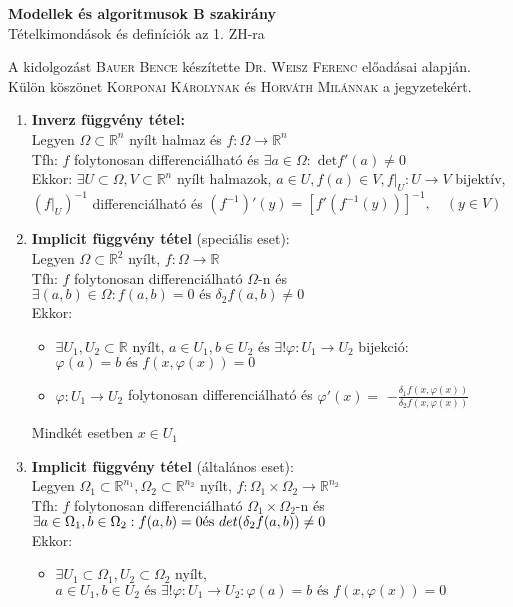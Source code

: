 \documentclass{article}
\begin{document}
\renewcommand{\labelitemi}{\textbullet}
\def\R{\mathbb{R}}
\def\br{\\[0.1cm]}
\def\folytdifh{folytonosan differenciálható }
\begin{center}
	{\Large\textbf{Modellek és algoritmusok B szakirány}}\\[0.2cm]
	Tételkimondások és definíciók az 1. ZH-ra
\end{center}
{\small A kidolgozást \textsc{Bauer Bence} készítette \textsc{Dr. Weisz Ferenc} előadásai alapján.}\\
{\footnotesize Külön köszönet \textsc{Korponai Károlynak} és \textsc{Horváth Milánnak} a jegyzetekért.}

\begin{enumerate}
	\item\textbf{Inverz függvény tétel:}\br
	Legyen $\Omega\subset\R^n$ nyílt halmaz és $f:\Omega\rightarrow\R^n$\br
	Tfh: $f$ \folytdifh és $\exists a\in\Omega:\text{ det}f'(a)\neq0$\br
	Ekkor: $\exists U\subset\Omega, V\subset\R^n$ nyílt halmazok, $a\in U, f(a)\in V,
	f|_U:U\rightarrow V$ bijektív,\br
	$(f|_U)^{-1}$ differenciálható és $(f^{-1})'(y)=[f'(f^{-1}(y))]^{-1},\quad (y\in V)$
	\item\textbf{Implicit függvény tétel} (speciális eset):\br
	Legyen $\Omega\subset\R^2$ nyílt, $f:\Omega\rightarrow\R$\br
	Tfh: $f$ folytonosan differenciálható $\Omega$-n és $\exists(a,b)\in\Omega:
	f(a,b)=0\text{ és }\delta_2f(a,b)\neq0$\br
	Ekkor:
	\begin{itemize}
		\item $\exists U_1, U_2\subset\R$ nyílt, $a\in U_1, b\in U_2\text{ és }\exists!\varphi:
		U_1\rightarrow U_2$ bijekció:$\varphi(a)=b\text{ és }f(x, \varphi(x))=0$
		\item $\varphi:U_1\rightarrow U_2$ \folytdifh és $\varphi'(x)=$
		\LARGE{$-\frac{\delta_1f(x, \varphi(x))}{\delta_2f(x, \varphi(x))}$}
	\end{itemize}
	Mindkét esetben $x\in U_1$
	\item\textbf{Implicit függvény tétel} (általános eset):\br
	Legyen $\Omega_1\subset\R^{n_1},\Omega_2\subset\R^{n_2}$ nyílt, 
	$f:\Omega_1\times\Omega_2\rightarrow\R^{n_2}$\br
	Tfh: $f$ \folytdifh $\Omega_1\times\Omega_2$-n és $\exists a\in\Omega_1, b\in\Omega_2:
	f(a,b)=0\br\text{és }det(\delta_2f(a,b))\neq0$\br
	Ekkor:
	\begin{itemize}
		\item $\exists U_1\subset\Omega_1, U_2\subset\Omega_2$ nyílt, $a\in U_1, b\in U_2\text{ és }\exists!\varphi:
		U_1\rightarrow U_2:\varphi(a)=b\text{ és }f(x, \varphi(x))=0$

\end{itemize}
\end{enumerate}
\end{document}
